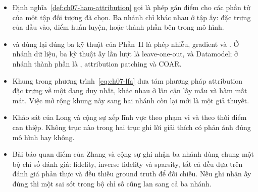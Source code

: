 \begin{tomtat}
\begin{itemize}
  \item Định nghĩa~\ref{def:ch07-ham-attribution} gọi 
  là phép gán điểm cho các phần tử của một tập đối tượng đã chọn. Ba nhánh chỉ
  khác nhau ở tập ấy: đặc trưng của đầu vào, điểm huấn luyện, hoặc thành phần
  bên trong mô hình.
  \item {} và
   dùng lại đúng ba kỹ thuật
  của Phần~II là phép nhiễu, gradient và
  . Ở nhánh dữ liệu, ba kỹ thuật ấy
  lần lượt là leave-one-out,  và
  Datamodel; ở nhánh thành phần là ,
  attribution patching và COAR.
  \item Khung  trong phương
  trình~\ref{eq:ch07-lfa} đưa tám phương pháp attribution đặc trưng về một dạng
  duy nhất, khác nhau ở lân cận lấy mẫu và hàm mất mát. Việc mở rộng khung này
  sang hai nhánh còn lại mới là một giả thuyết.
  \item Khảo sát của Long và cộng sự xếp lĩnh vực theo phạm vi và theo thời điểm
  can thiệp. Không trục nào trong hai trục ghi lời giải thích có phản ánh đúng
  mô hình hay không.
  \item Bài báo quan điểm của Zhang và cộng sự ghi nhận ba nhánh dùng chung một
  bộ chỉ số đánh giá: fidelity,
  inverse fidelity và sparsity, tất cả đều dựa trên đánh giá phản thực và đều
  thiếu ground truth để đối chiếu. Nếu ghi nhận ấy đúng thì một sai sót trong bộ
  chỉ số cũng lan sang cả ba nhánh.
\end{itemize}
\end{tomtat}

